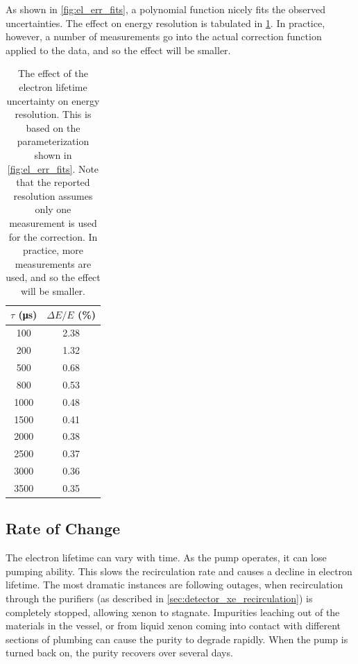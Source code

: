\documentclass[herrin-thesis.tex]{subfiles}
\begin{document}
As shown in \cref{fig:el_err_fits}, a polynomial function nicely fits the observed uncertainties. The effect on energy resolution is tabulated in \cref{tab:el_res_dtau}. In practice, however, a number of measurements go into the actual correction function applied to the data, and so the effect will be smaller.

\begin{table}[tbp]
\centering
\caption[Effect of electron lifetime uncertainty on resolution]{The effect of the electron lifetime uncertainty on energy resolution. This is based on the parameterization shown in \cref{fig:el_err_fits}. Note that the reported resolution assumes only one measurement is used for the correction. In practice, more measurements are used, and so the effect will be smaller.}
\label{tab:el_res_dtau}
\begin{tabular}{c c}\toprule
	\(\tau\) (\si{\micro\second})&	\(\Delta E / E\) (\%) 	\\\midrule
	100					&	2.38				\\
	200					&	1.32				\\
	500					&	0.68				\\
	800					&	0.53				\\
	1000					&	0.48				\\
	1500					&	0.41				\\
	2000					&	0.38				\\
	2500					&	0.37				\\
	3000					&	0.36				\\
	3500					&	0.35				\\\bottomrule
\end{tabular}
\end{table}

\subsection{Rate of Change}
The electron lifetime can vary with time. As the pump operates, it can lose pumping ability. This slows the recirculation rate and causes a decline in electron lifetime. The most dramatic instances are following outages, when recirculation through the purifiers (as described in \cref{sec:detector_xe_recirculation}) is completely stopped, allowing xenon to stagnate. Impurities leaching out of the materials in the vessel, or from liquid xenon coming into contact with different sections of plumbing can cause the purity to degrade rapidly. When the pump is turned back on, the purity recovers over several days.
\end{document}
